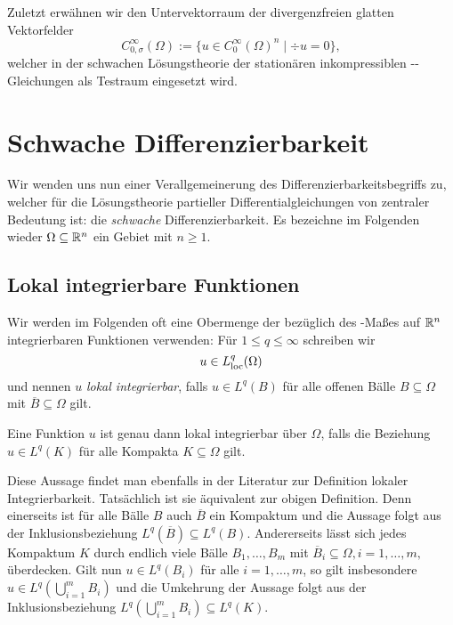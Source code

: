 Zuletzt erwähnen wir den Untervektorraum der divergenzfreien glatten Vektorfelder
$$
C_{0,\sigma}^\infty(\Omega) := \{u \in C_0^\infty(\Omega)^n \mid \div u = 0\},
$$
 welcher in der schwachen Lösungstheorie der stationären inkompressiblen \navier\hyp{}\stokes\hyp{}Gleichungen als Testraum eingesetzt wird.

\section{Schwache Differenzierbarkeit}
\label{subsec:distributionsSobolev}

Wir wenden uns nun einer Verallgemeinerung des Differenzierbarkeitsbegriffs zu, welcher für die Lösungstheorie partieller Differentialgleichungen von zentraler Bedeutung ist: die \emph{schwache} Differenzierbarkeit.
Es bezeichne im Folgenden wieder $\Omega \subseteq \mathbb{R}^n$ ein Gebiet mit $n \geq 1$.

\subsection{Lokal integrierbare Funktionen}

Wir werden im Folgenden oft eine Obermenge der bezüglich des \lebesgue\hyp{}Maßes auf $\mathbb{R}^n$ integrierbaren Funktionen verwenden:
Für $1 \leq q \leq \infty$ schreiben wir
$$
  u \in L^q_{\operatorname{loc}}(\Omega)
$$
und nennen $u$ \emph{lokal integrierbar}, falls $u \in L^q(B)$ für alle offenen Bälle $B \subseteq \Omega$ mit $\overline B \subseteq \Omega$ gilt.

\begin{bem}
  Eine Funktion $u$ ist genau dann lokal integrierbar über $\Omega$, falls die Beziehung $u \in L^q(K)$ für alle Kompakta $K \subseteq \Omega$ gilt.

  Diese Aussage findet man ebenfalls in der Literatur zur Definition lokaler Integrierbarkeit.
  Tatsächlich ist sie äquivalent zur obigen Definition.
  Denn einerseits ist für alle Bälle $B$ auch $\overline B$ ein Kompaktum und die Aussage folgt aus der Inklusionsbeziehung $L^q(\overline B) \subseteq L^q(B)$.
  Andererseits lässt sich jedes Kompaktum $K$ durch endlich viele Bälle $B_1, \dots, B_m$ mit $\overline B_i \subseteq \Omega, i =1,\dots,m,$ überdecken. 
  Gilt nun $u \in L^q(B_i)$ für alle $i = 1, \dots, m$, so gilt insbesondere $u \in L^q(\bigcup_{i = 1}^m B_i)$ und die Umkehrung der Aussage folgt aus der Inklusionsbeziehung $L^q(\bigcup_{i = 1}^m B_i) \subseteq L^q(K)$.
\end{bem}

